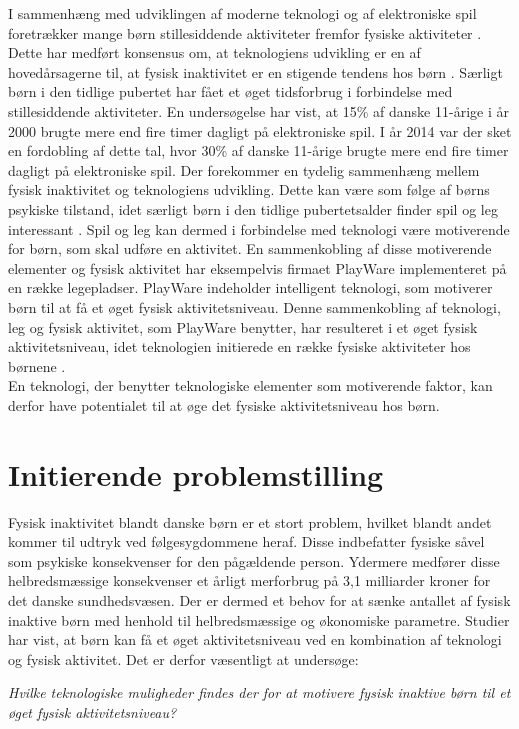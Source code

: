 I sammenhæng med udviklingen af moderne teknologi og af elektroniske spil foretrækker mange børn stillesiddende aktiviteter fremfor fysiske aktiviteter \citep{Universitet2014}. Dette har medført konsensus om, at teknologiens udvikling er en af hovedårsagerne til, at fysisk inaktivitet er en stigende tendens hos børn \citep{Kiens2007}.
Særligt børn i den tidlige pubertet har fået et øget tidsforbrug i forbindelse med stillesiddende aktiviteter. En undersøgelse har vist, at 15\% af danske 11-årige i år 2000 brugte mere end fire timer dagligt på elektroniske spil. I år 2014 var der sket en fordobling af dette tal, hvor 30\% af danske 11-årige brugte mere end fire timer dagligt på elektroniske spil. \citep{Universitet2014} \newline
Der forekommer en tydelig sammenhæng mellem fysisk inaktivitet og teknologiens udvikling. Dette kan være som følge af børns psykiske tilstand, idet særligt børn i den tidlige pubertetsalder finder spil og leg interessant \citep{Wied2011}. Spil og leg kan dermed i forbindelse med teknologi være motiverende for børn, som skal udføre en aktivitet. En sammenkobling af disse motiverende elementer og fysisk aktivitet har eksempelvis firmaet PlayWare implementeret på en række legepladser. PlayWare indeholder intelligent teknologi, som motiverer børn til at få et øget fysisk aktivitetsniveau. Denne sammenkobling af teknologi, leg og fysisk aktivitet, som PlayWare benytter, har resulteret i et øget fysisk aktivitetsniveau, idet teknologien initierede en række fysiske aktiviteter hos børnene \citep{Rishoej2010}. \\
En teknologi, der benytter teknologiske elementer som motiverende faktor, kan derfor have potentialet til at øge det fysiske aktivitetsniveau hos børn.

\section{Initierende problemstilling}
Fysisk inaktivitet blandt danske børn er et stort problem, hvilket blandt andet kommer til udtryk ved følgesygdommene heraf. Disse indbefatter fysiske såvel som psykiske konsekvenser for den pågældende person. Ydermere medfører disse helbredsmæssige konsekvenser et årligt merforbrug på 3,1 milliarder kroner for det danske sundhedsvæsen. Der er dermed et behov for at sænke antallet af fysisk inaktive børn med henhold til helbredsmæssige og økonomiske parametre. Studier har vist, at børn kan få et øget aktivitetsniveau ved en kombination af teknologi og fysisk aktivitet. Det er derfor væsentligt at undersøge: 

\begin{center}
\textit{Hvilke teknologiske muligheder findes der for at motivere fysisk inaktive børn til et øget fysisk aktivitetsniveau?}
\end{center}